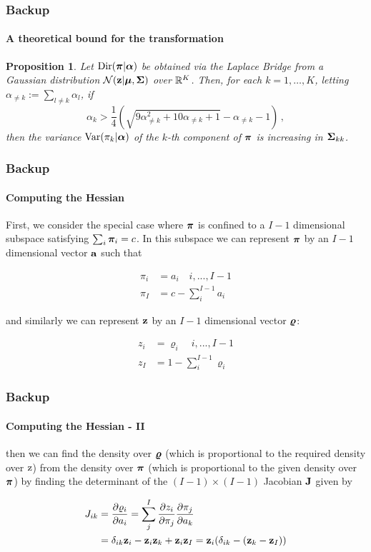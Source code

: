 \documentclass[10pt,usepdftitle=false,aspectratio=169,handout]{beamer}
\newtheorem{proposition}{Proposition}
\begin{document}

\begin{frame}\frametitle{Backup}
	\framesubtitle{A theoretical bound for the transformation}
	\begin{proposition} \label{prop:dir_var_from_gaussian}
		Let $\mathrm{Dir}(\boldsymbol{\pi} | {\boldsymbol{\alpha}})$ be obtained via the Laplace Bridge from a Gaussian distribution $\mathcal{N}(\mathbf{z} | {\boldsymbol{\mu}}, {\boldsymbol{\Sigma}})$ over $\mathbb{R}^K$. Then, for each $k = 1, \dots, K$, letting $\alpha_{\neq k} := \sum_{l \neq k} \alpha_l$, if
		\begin{equation*}
		\alpha_k > \frac{1}{4} \left(\sqrt{9\alpha_{\neq k}^2 + 10\alpha_{\neq k} + 1} - \alpha_{\neq k} - 1\right) \, ,
		\end{equation*}
		then the variance $\mathrm{Var}(\pi_k | {\boldsymbol{\alpha}})$ of the $k$-th component of $\boldsymbol{\pi}$ is increasing in ${\boldsymbol{\Sigma}}_{kk}$.
	\end{proposition}
\end{frame}


\begin{frame}\frametitle{Backup}
	\framesubtitle{Computing the Hessian}
	First, we consider the special case where $\boldsymbol{\pi}$ is confined to a $I-1$ dimensional subspace satisfying $\sum_i \boldsymbol{\pi}_i = c$. In this subspace we can represent $\boldsymbol{\pi}$ by an $I - 1$ dimensional vector $\mathbf{a}$ such that 
	
	\begin{align}
	\pi_i &= a_i \quad i,...,I-1 \\
	\pi_I &= c - \sum_i^{I-1} a_i
	\end{align}
	
	and similarly we can represent $\mathbf{z}$ by an $I-1$ dimensional vector ${\boldsymbol{\varrho}}$:
	
	\begin{align}
	z_i &= \varrho_i \quad i,...,I-1 \\
	z_I &= 1 - \sum_i^{I-1}\varrho_i
	\end{align}
\end{frame}


\begin{frame}\frametitle{Backup}
	\framesubtitle{Computing the Hessian - II}
	then we can find the density over ${\boldsymbol{\varrho}}$ (which is proportional to the required density over ${\textnormal{z}}$)
	from the density over $\boldsymbol{\pi}$ (which is proportional to the given density over $\boldsymbol{\pi}$) by finding the
	determinant of the $(I - 1) \times (I - 1)$ Jacobian ${\mathbf{J}}$ given by
	
	\begin{align}
	J_{ik} &= \frac{\partial \varrho_i}{\partial a_i} = \sum_j^{I} \frac{\partial z_i}{\partial \pi_j}\frac{\partial \pi_j}{\partial a_k} \\
	&= \delta_{ik}{\mathbf{z}}_i - {\mathbf{z}}_i{\mathbf{z}}_k + {\mathbf{z}}_i{\mathbf{z}}_I =  {\mathbf{z}}_i(\delta_{ik} - ({\mathbf{z}}_k - {\mathbf{z}}_I))
	\end{align}
\end{frame}
\end{document}
